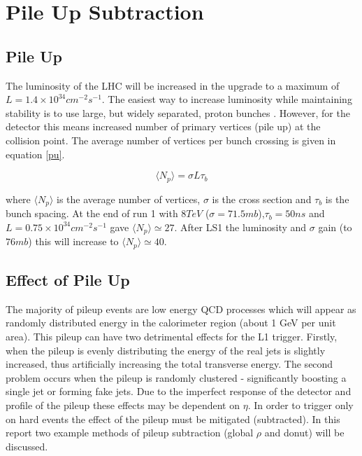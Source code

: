 \section{Pile Up Subtraction}
\subsection{Pile Up}
The luminosity of the LHC will be increased in the upgrade to a maximum of $L = 1.4\times10^{34} cm^{-2}s^{-1}$. The easiest way to increase luminosity while maintaining stability is to use large, but widely separated, proton bunches \cite{PUform}. However, for the detector this means increased number of primary vertices (pile up) at the collision point. The average number of vertices per bunch crossing is given in equation \ref{pu}.

\begin{equation}
\langle N_p \rangle = \sigma L \tau_b
\label{pu}
\end{equation}

where $\langle N_p \rangle$ is the average number of vertices, $\sigma$ is the cross section and $\tau_b$ is the bunch spacing. At the end of run 1 with $8 TeV$ ($\sigma = 71.5mb$),$\tau_b = 50ns$ and $L = 0.75\times10^{34} cm^{-2}s^{-1}$ gave $\langle N_p \rangle\simeq27$. After LS1 the luminosity and $\sigma$ gain (to $76mb$) this will increase to $\langle N_p \rangle\simeq40$. 
\subsection{Effect of Pile Up}
The majority of pileup events are low energy QCD processes which will appear as randomly distributed energy in the calorimeter region (about 1 GeV per unit area). This pileup can have two detrimental effects for the L1 trigger. Firstly, when the pileup is evenly distributing the energy of the real jets is slightly increased, thus artificially increasing the total transverse energy. The second problem occurs when the pileup is randomly clustered - significantly boosting a single jet or forming fake jets. Due to the imperfect response of the detector and profile of the pileup these effects may be dependent on $\eta$. In order to trigger only on hard events the effect of the pileup must be mitigated (subtracted). In this report two example methods of pileup subtraction (global $\rho$ and donut) will be discussed.
